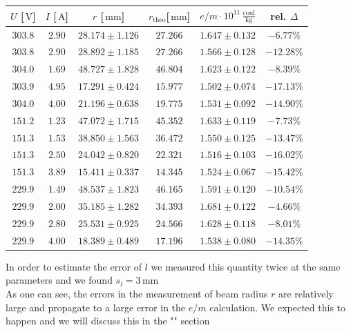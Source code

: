 \documentclass{scrreprt}
\newcommand{\unit}[1]{\ensuremath{\, \mathrm{#1}}}
\begin{document}
\begin{table}[H]
\center
\begin{tabular}{|c|c|c|c|c|c|}
\hline
$U$ [$\unit{V}$] & $I$ [$\unit{A}$] & $r$ [$\unit{mm}$] & $r_{\text{theo}}$[$\unit{mm}$] & $e/m \cdot 10^{11} \unit{\frac{coul}{kg}}$ & rel. $\Delta$\\ \hline\hline
$303.8$ & $2.90$ & $28.174 \pm 1.126$ & $27.266$ & $1.647 \pm 0.132$ & $-6.77 \%$\\
$303.8$ & $2.90$ & $28.892 \pm 1.185$ & $27.266$ & $1.566 \pm 0.128$ & $-12.28 \%$\\
$304.0$ & $1.69$ & $48.727 \pm 1.828$ & $46.804$ & $1.623 \pm 0.122$ & $-8.39 \%$\\
$303.9$ & $4.95$ & $17.291 \pm 0.424$ & $15.977$ & $1.502 \pm 0.074$ & $-17.13 \%$\\
$304.0$ & $4.00$ & $21.196 \pm 0.638$ & $19.775$ & $1.531 \pm 0.092$ & $-14.90 \%$\\
$151.2$ & $1.23$ & $47.072 \pm 1.715$ & $45.352$ & $1.633 \pm 0.119$ & $-7.73 \%$\\
$151.3$ & $1.53$ & $38.850 \pm 1.563$ & $36.472$ & $1.550 \pm 0.125$ & $-13.47 \%$\\
$151.3$ & $2.50$ & $24.042 \pm 0.820$ & $22.321$ & $1.516 \pm 0.103$ & $-16.02 \%$\\
$151.3$ & $3.89$ & $15.411 \pm 0.337$ & $14.345$ & $1.524 \pm 0.067$ & $-15.42 \%$\\
$229.9$ & $1.49$ & $48.537 \pm 1.823$ & $46.165$ & $1.591 \pm 0.120$ & $-10.54 \%$\\
$229.9$ & $2.00$ & $35.185 \pm 1.282$ & $34.393$ & $1.681 \pm 0.122$ & $-4.66 \%$\\
$229.9$ & $2.80$ & $25.531 \pm 0.925$ & $24.566$ & $1.628 \pm 0.118$ & $-8.01 \%$\\
$229.9$ & $4.00$ & $18.389 \pm 0.489$ & $17.196$ & $1.538 \pm 0.080$ & $-14.35 \%$\\
\hline
\end{tabular}
\end{table}

In order to estimate the error of $l$ we measured this quantity twice at the same parameters and we found $s_l = 3 \unit{mm}$\\

As one can see, the errors in the measurement of beam radius $r$ are relatively large and propagate to a large error in the $e/m$ calculation. We expected this to happen and we will discuss this in the "" section
\end{document}

